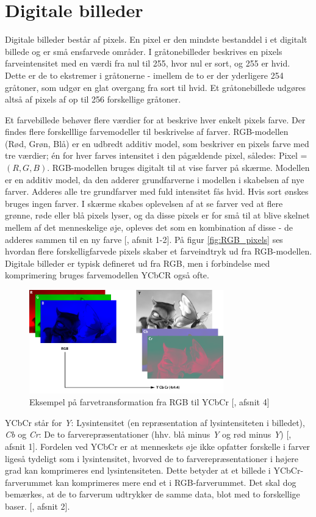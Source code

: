 \chapter{Digitale billeder} \label{sec:teori_intro}
Digitale billeder består af pixels. En pixel er den mindste bestanddel i et digitalt billede og er små ensfarvede områder. I gråtonebilleder beskrives en pixels farveintensitet med en værdi fra nul til 255, hvor nul er sort, og 255 er hvid. Dette er de to ekstremer i gråtonerne - imellem de to er der yderligere 254 gråtoner, som udgør en glat overgang fra sort til hvid. Et gråtonebillede udgøres altså af pixels af op til 256 forskellige gråtoner.

Et farvebillede behøver flere værdier for at beskrive hver enkelt pixels farve. Der findes flere forskelllige farvemodeller til beskrivelse af farver. RGB-modellen (Rød, Grøn, Blå) er en udbredt additiv model, som beskriver en pixels farve med tre værdier; én for hver farves intensitet i den pågældende pixel, således: Pixel = $(R,G,B)$. RGB-modellen bruges digitalt til at vise farver på skærme. Modellen er en additiv model, da den adderer grundfarverne i modellen i skabelsen af nye farver. Adderes alle tre grundfarver med fuld intensitet fås hvid. Hvis sort ønskes bruges ingen farver. I skærme skabes oplevelsen af at se farver ved at flere grønne, røde eller blå pixels lyser, og da disse pixels er for små til at blive skelnet mellem af det menneskelige øje, opleves det som en kombination af disse - de adderes sammen til en ny farve [\citet{curtis_newbold}, afsnit 1-2]. På figur \vref{fig:RGB_pixels} ses hvordan flere forskelligfarvede pixels skaber et farveindtryk ud fra RGB-modellen. Digitale billeder er typisk defineret ud fra RGB, men i forbindelse med komprimering bruges farvemodellen YCbCR også ofte.
\begin{figure}[htbp]
\centering
\includegraphics[width=0.75\textwidth]{Billeder/farvemodeller.png}
\caption{Eksempel på farvetransformation fra RGB til YCbCr [\citet{farvetransformation}, afsnit 4]}
\label{fig:farvemodeller}
\end{figure}
YCbCr står for \emph{Y}: Lysintensitet (en repræsentation af lysintensiteten i billedet), \emph{Cb} og \emph{Cr}: De to farverepræsentationer (hhv. blå minus \emph{Y} og rød minus \emph{Y}) [\citet{ycbcr_definition}, afsnit 1]. Fordelen ved YCbCr er at menneskets øje ikke opfatter forskelle i farver ligeså tydeligt som i lysintensitet, hvorved de to farverepræsentationer i højere grad kan komprimeres end lysintensiteten. Dette betyder at et billede i YCbCr-farverummet kan komprimeres mere end et i RGB-farverummet. Det skal dog bemærkes, at de to farverum udtrykker de samme data, blot med to forskellige baser. [\citet{ycbcr}, afsnit 2].

